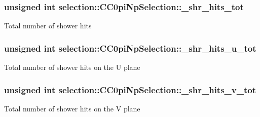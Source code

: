 \subsubsection[{\texorpdfstring{\+\_\+shr\+\_\+hits\+\_\+tot}{_shr_hits_tot}}]{\setlength{\rightskip}{0pt plus 5cm}unsigned int selection\+::\+C\+C0pi\+Np\+Selection\+::\+\_\+shr\+\_\+hits\+\_\+tot\hspace{0.3cm}{\ttfamily [private]}}\hypertarget{classselection_1_1CC0piNpSelection_aa6e7162371e3e343df001f0afc8a20b8}{}\label{classselection_1_1CC0piNpSelection_aa6e7162371e3e343df001f0afc8a20b8}
Total number of shower hits 
\subsubsection[{\texorpdfstring{\+\_\+shr\+\_\+hits\+\_\+u\+\_\+tot}{_shr_hits_u_tot}}]{\setlength{\rightskip}{0pt plus 5cm}unsigned int selection\+::\+C\+C0pi\+Np\+Selection\+::\+\_\+shr\+\_\+hits\+\_\+u\+\_\+tot\hspace{0.3cm}{\ttfamily [private]}}\hypertarget{classselection_1_1CC0piNpSelection_afba4a31f84c2f125323b90f007bda1c6}{}\label{classselection_1_1CC0piNpSelection_afba4a31f84c2f125323b90f007bda1c6}
Total number of shower hits on the U plane 
\subsubsection[{\texorpdfstring{\+\_\+shr\+\_\+hits\+\_\+v\+\_\+tot}{_shr_hits_v_tot}}]{\setlength{\rightskip}{0pt plus 5cm}unsigned int selection\+::\+C\+C0pi\+Np\+Selection\+::\+\_\+shr\+\_\+hits\+\_\+v\+\_\+tot\hspace{0.3cm}{\ttfamily [private]}}\hypertarget{classselection_1_1CC0piNpSelection_ab6aaf4282fa9d2e5971e162c66901227}{}\label{classselection_1_1CC0piNpSelection_ab6aaf4282fa9d2e5971e162c66901227}
Total number of shower hits on the V plane 
